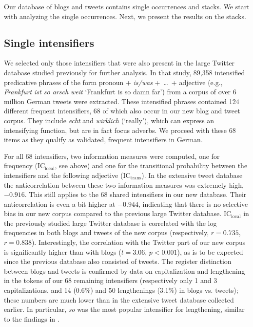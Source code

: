 \documentclass[output=paper,colorlinks,citecolor=brown]{langscibook}
\begin{document}
Our database of blogs and tweets contains single occurrences and stacks. We start with analyzing the single occurrences. Next, we present the results on the stacks.

\subsection{Single intensifiers}

We selected only those intensifiers that were also present in the large Twitter database studied previously \citep{scherihou2022} for further analysis. In that  study,  89,358 intensified predicative phrases of the form pronoun + \textit{is/was} +\ \ldots\ + adjective (e.g., \textit{Frankfurt ist so arsch weit} `Frankfurt is so damn far') from a corpus of over 6 million German tweets were extracted.
These intensified phrases contained 124 different frequent intensifiers, 68 of which also occur in our new blog and tweet corpus. They include \textit{echt} and \textit{wirklich} (`really'), which can express an intensifying function, but are in fact focus adverbs.
We proceed with these 68 items as they qualify as validated, frequent intensifiers in German.

For all 68 intensifiers, two information measures were computed, one for frequency ($\mathrm{IC_{local}}$, see above) and one for the transitional probability between the intensifiers and the following adjective ($\mathrm{IC_{trans}}$).
In the extensive tweet database \citep{scherihou2022} the anticorrelation between these two information measures was extremely high, $-0.916$. This still applies to the  68 shared intensifiers in our new database. Their anticorrelation is even a bit higher at  $-0.944$, indicating that there is no selective bias in our new corpus compared to the previous large Twitter database. $\mathrm{IC_{local}}$ in the previously studied large Twitter database is  correlated with the log frequencies in both blogs and tweets of the new corpus (respectively, $r = 0.735$, $r = 0.838$). Interestingly, the correlation with the Twitter part of our new corpus is significantly higher than with blogs ($t = 3.06$, $p <0.001$), as is to be expected since the previous database also consisted of tweets. The register distinction between blogs and tweets is confirmed by data on capitalization and lengthening in the tokens of our 68 remaining intensifiers (respectively only 1 and 3 capitalizations, and  14 (0.6\%) and 50 lengthenings (3.1\%) in blogs vs. tweets); these numbers are much lower than in the extensive tweet database collected earlier. In particular, \textit{so} was the most popular intensifier for lengthening, similar to the findings in \citet{scherihou2022}.
\end{document}
